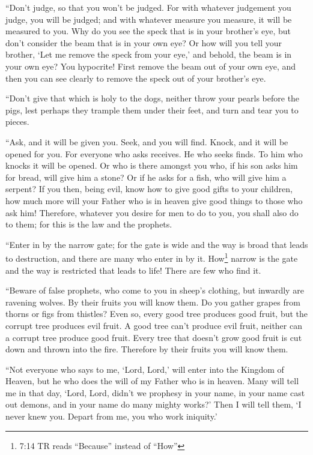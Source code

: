  ``Don't judge, so that you won't be judged. 
For with whatever judgement you judge, you will be judged; and with
whatever measure you measure, it will be measured to you. 
Why do you see the speck that is in your brother's eye, but don't
consider the beam that is in your own eye?  Or how will you
tell your brother, `Let me remove the speck from your eye,' and behold,
the beam is in your own eye?  You hypocrite! First remove
the beam out of your own eye, and then you can see clearly to remove the
speck out of your brother's eye.

 ``Don't give that which is holy to the dogs, neither throw
your pearls before the pigs, lest perhaps they trample them under their
feet, and turn and tear you to pieces.

 ``Ask, and it will be given you. Seek, and you will find.
Knock, and it will be opened for you.  For everyone who asks
receives. He who seeks finds. To him who knocks it will be opened.
 Or who is there amongst you who, if his son asks him for
bread, will give him a stone?  Or if he asks for a fish,
who will give him a serpent?  If you then, being evil, know
how to give good gifts to your children, how much more will your Father
who is in heaven give good things to those who ask him! 
Therefore, whatever you desire for men to do to you, you shall also do
to them; for this is the law and the prophets.

 ``Enter in by the narrow gate; for the gate is wide and
the way is broad that leads to destruction, and there are many who enter
in by it.  How\footnote{7:14 TR reads ``Because'' instead
  of ``How''} narrow is the gate and the way is restricted that leads to
life! There are few who find it.

 ``Beware of false prophets, who come to you in sheep's
clothing, but inwardly are ravening wolves.  By their
fruits you will know them. Do you gather grapes from thorns or figs from
thistles?  Even so, every good tree produces good fruit,
but the corrupt tree produces evil fruit.  A good tree
can't produce evil fruit, neither can a corrupt tree produce good fruit.
 Every tree that doesn't grow good fruit is cut down and
thrown into the fire.  Therefore by their fruits you will
know them.

 ``Not everyone who says to me, `Lord, Lord,' will enter
into the Kingdom of Heaven, but he who does the will of my Father who is
in heaven.  Many will tell me in that day, `Lord, Lord,
didn't we prophesy in your name, in your name cast out demons, and in
your name do many mighty works?'  Then I will tell them, `I
never knew you. Depart from me, you who work iniquity.'

